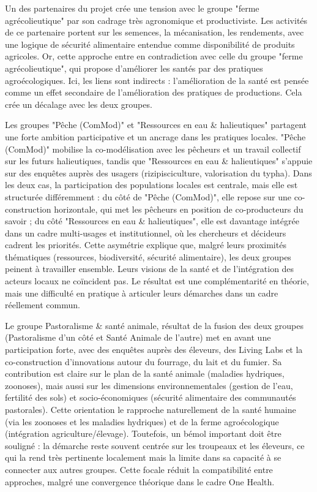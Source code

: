 \documentclass{article}
\begin{document}
Un des partenaires du projet crée une tension avec le groupe "ferme agrécolieutique" par son cadrage très agronomique et productiviste. Les activités de ce partenaire portent sur les semences, la mécanisation, les rendements, avec une logique de sécurité alimentaire entendue comme disponibilité de produits agricoles. Or, cette approche entre en contradiction avec celle du groupe "ferme agrécolieutique", qui propose d'améliorer les santés par des pratiques agroécologiques. Ici, les liens sont indirects : l'amélioration de la santé est pensée comme un effet secondaire de l’amélioration des pratiques de productions. Cela crée un décalage avec les deux groupes.

Les groupes "Pêche (ComMod)" et "Ressources en eau \& halieutiques" partagent une forte ambition participative et un ancrage dans les pratiques locales. "Pêche (ComMod)" mobilise la co-modélisation avec les pêcheurs et un travail collectif sur les futurs halieutiques, tandis que "Ressources en eau \& halieutiques" s’appuie sur des enquêtes auprès des usagers (rizipisciculture, valorisation du typha). Dans les deux cas, la participation des populations locales est centrale, mais elle est structurée différemment : du côté de "Pêche (ComMod)", elle repose sur une co-construction horizontale, qui met les pêcheurs en position de co-producteurs du savoir ; du côté "Ressources en eau \& halieutiques", elle est davantage intégrée dans un cadre multi-usages et institutionnel, où les chercheurs et décideurs cadrent les priorités. Cette asymétrie explique que, malgré leurs proximités thématiques (ressources, biodiversité, sécurité alimentaire), les deux groupes peinent à travailler ensemble. Leurs visions de la santé et de l’intégration des acteurs locaux ne coïncident pas. Le résultat est une complémentarité en théorie, mais une difficulté en pratique à articuler leurs démarches dans un cadre réellement commun.

Le groupe Pastoralisme \& santé animale, résultat de la fusion des deux groupes (Pastoralisme d'un côté et Santé Animale de l'autre) met en avant une participation forte, avec des enquêtes auprès des éleveurs, des Living Labs et la co-construction d’innovations autour du fourrage, du lait et du fumier. Sa contribution est claire sur le plan de la santé animale (maladies hydriques, zoonoses), mais aussi sur les dimensions environnementales (gestion de l’eau, fertilité des sols) et socio-économiques (sécurité alimentaire des communautés pastorales). Cette orientation le rapproche naturellement de la santé humaine (via les zoonoses et les maladies hydriques) et de la ferme agroécologique (intégration agriculture/élevage). Toutefois, un bémol important doit être souligné : la démarche reste souvent centrée sur les troupeaux et les éleveurs, ce qui la rend très pertinente localement mais la limite dans sa capacité à se connecter aux autres groupes. Cette focale réduit la compatibilité entre approches, malgré une convergence théorique dans le cadre One Health.
\end{document}
